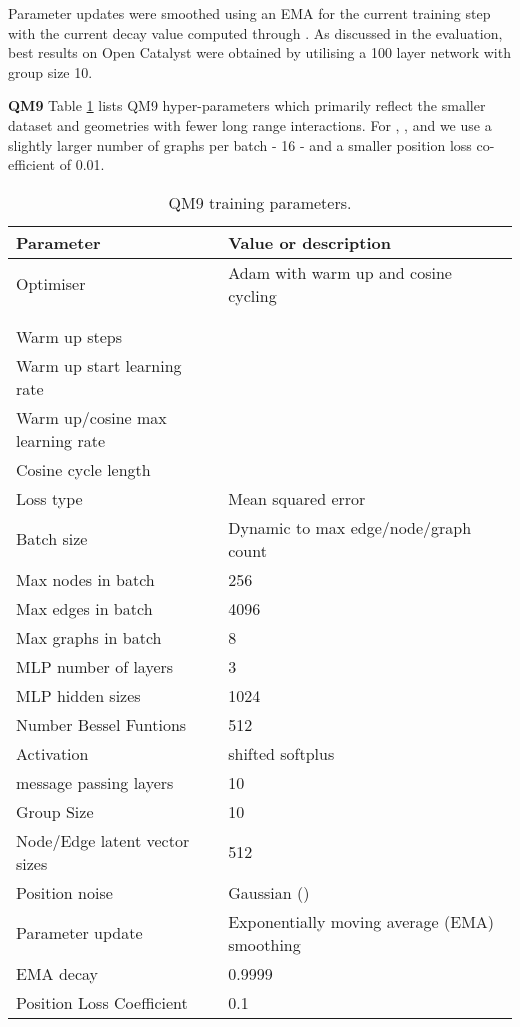 \documentclass{article} \usepackage{iclr2022_conference,times}
\begin{document}
Parameter updates were smoothed using an EMA for the current training step with the current decay value computed through .
As discussed in the evaluation, best results on Open Catalyst were obtained by utilising a 100 layer network with group size 10.

\textbf{QM9}
Table \ref{qm9_params} lists QM9 hyper-parameters which primarily reflect the smaller dataset and geometries with fewer long range interactions. For , ,  and  we use a slightly larger number of graphs per batch - 16 - and a smaller position loss co-efficient of 0.01. 

\begin{table}[]
\caption{QM9 training parameters.}
    \label{qm9_params}
    \centering
    \begin{tabular}{ll}
      \toprule
       Parameter & Value or description \\
       \midrule
       Optimiser & Adam with warm up and cosine cycling \\
          &  \\              
          &  \\                     
       Warm up steps    &  \\
       Warm up start learning rate    &  \\       
       Warm up/cosine max learning rate    &  \\       
       Cosine cycle length    &  \\       
       Loss type & Mean squared error \\
     \midrule
       Batch size & Dynamic to max edge/node/graph count \\
       Max nodes in batch & 256 \\
       Max edges in batch & 4096 \\   
       Max graphs in batch & 8 \\    
     \midrule
       MLP number of layers & 3 \\
       MLP hidden sizes & 1024 \\
       Number Bessel Funtions & 512 \\
       Activation & shifted softplus \\
       message passing layers & 10 \\
       Group Size & 10 \\
       Node/Edge latent vector sizes & 512 \\ 
     \midrule
       Position noise & Gaussian () \\
       Parameter update & Exponentially moving average (EMA) smoothing \\
       EMA decay & 0.9999 \\
       Position Loss Coefficient & 0.1 \\
    \bottomrule

\end{tabular}
\end{table}
\end{document}
